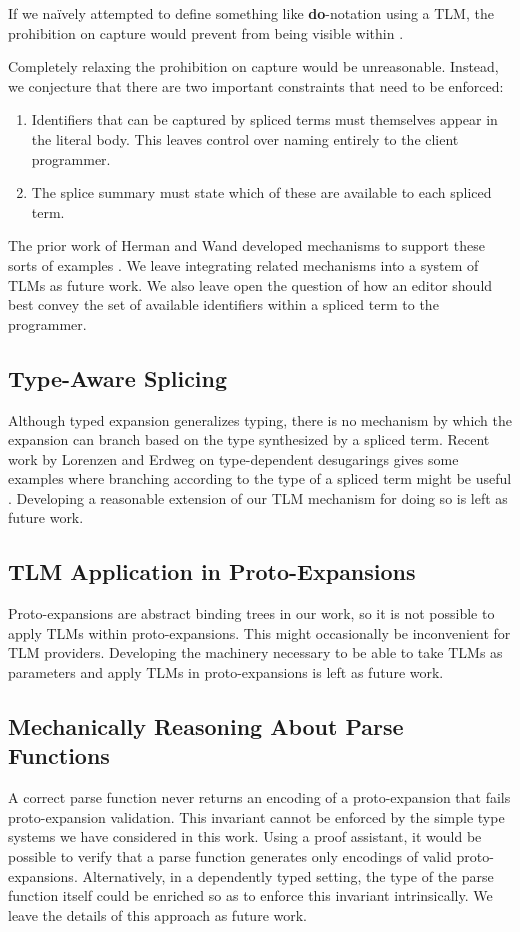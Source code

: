 If we na\"ively attempted to define something like \textbf{do}-notation using a TLM, the prohibition on capture would prevent  from being visible within .

Completely relaxing the prohibition on capture would be unreasonable. Instead, we conjecture that there are two important constraints that need to be enforced:
\begin{enumerate}
  \item Identifiers that can be captured by spliced terms must themselves appear in the literal body. This leaves control over naming entirely to the client programmer.
  \item The splice summary must state which of these are available to each spliced term.
\end{enumerate}

The prior work of Herman and Wand developed mechanisms to support these sorts of examples \cite{DBLP:conf/esop/HermanW08,Herman10:Theory}. We leave integrating related mechanisms into a system of TLMs as future work. We also leave open the question of how an editor should best convey the set of available identifiers within a spliced term to the programmer.

\subsection{Type-Aware Splicing}\label{sec:type-aware-splicing}
Although typed expansion generalizes typing, there is no mechanism by which the expansion can branch based on the type synthesized by a spliced term. Recent work by Lorenzen and Erdweg on type-dependent desugarings gives some examples where branching according to the type of a spliced term might be useful \cite{conf/popl/LorenzenE16}. Developing a reasonable extension of our TLM mechanism for doing so is left as future work.

\subsection{TLM Application in Proto-Expansions}
Proto-expansions are abstract binding trees in our work, so it is not possible to apply TLMs within proto-expansions. This might occasionally be inconvenient for TLM providers. Developing the machinery necessary to be able to take TLMs as parameters and apply TLMs in proto-expansions is left as future work.

\subsection{Mechanically Reasoning About Parse Functions}\label{sec:verifying-tsms}
A correct parse function never returns an encoding of a proto-expansion that fails proto-expansion validation. This invariant cannot be enforced by the simple type systems we have considered in this work. Using a proof assistant, it would be possible to verify that a parse function generates only encodings of valid proto-expansions. Alternatively, in a dependently typed setting, the type of the parse function itself could be enriched so as to enforce this invariant intrinsically. We leave the details of this approach as future work.

